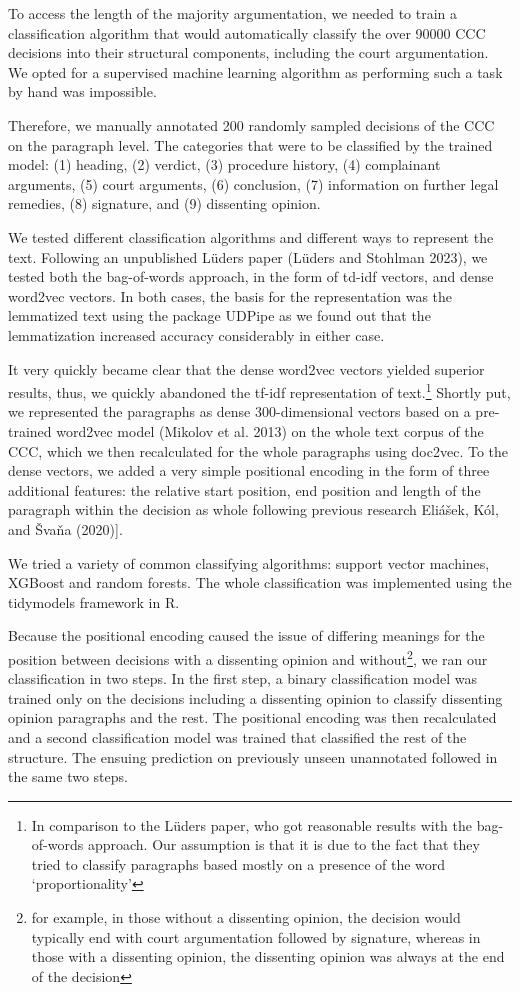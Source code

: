 \documentclass[
  11pt,
]{article}
\begin{document}
To access the length of the majority argumentation, we needed to train a
classification algorithm that would automatically classify the over
90000 CCC decisions into their structural components, including the
court argumentation. We opted for a supervised machine learning
algorithm as performing such a task by hand was impossible.

Therefore, we manually annotated 200 randomly sampled decisions of the
CCC on the paragraph level. The categories that were to be classified by
the trained model: (1) heading, (2) verdict, (3) procedure history, (4)
complainant arguments, (5) court arguments, (6) conclusion, (7)
information on further legal remedies, (8) signature, and (9) dissenting
opinion.

We tested different classification algorithms and different ways to
represent the text. Following an unpublished Lüders paper (Lüders and
Stohlman 2023), we tested both the bag-of-words approach, in the form of
td-idf vectors, and dense word2vec vectors. In both cases, the basis for
the representation was the lemmatized text using the package UDPipe as
we found out that the lemmatization increased accuracy considerably in
either case.

It very quickly became clear that the dense word2vec vectors yielded
superior results, thus, we quickly abandoned the tf-idf representation
of text.\footnote{In comparison to the Lüders paper, who got reasonable
  results with the bag-of-words approach. Our assumption is that it is
  due to the fact that they tried to classify paragraphs based mostly on
  a presence of the word `proportionality'} Shortly put, we represented
the paragraphs as dense 300-dimensional vectors based on a pre-trained
word2vec model (Mikolov et al. 2013) on the whole text corpus of the
CCC, which we then recalculated for the whole paragraphs using doc2vec.
To the dense vectors, we added a very simple positional encoding in the
form of three additional features: the relative start position, end
position and length of the paragraph within the decision as whole
following previous research Eliášek, Kól, and Švaňa (2020){]}.

We tried a variety of common classifying algorithms: support vector
machines, XGBoost and random forests. The whole classification was
implemented using the tidymodels framework in R.

Because the positional encoding caused the issue of differing meanings
for the position between decisions with a dissenting opinion and
without\footnote{for example, in those without a dissenting opinion, the
  decision would typically end with court argumentation followed by
  signature, whereas in those with a dissenting opinion, the dissenting
  opinion was always at the end of the decision}, we ran our
classification in two steps. In the first step, a binary classification
model was trained only on the decisions including a dissenting opinion
to classify dissenting opinion paragraphs and the rest. The positional
encoding was then recalculated and a second classification model was
trained that classified the rest of the structure. The ensuing
prediction on previously unseen unannotated followed in the same two
steps.
\end{document}
